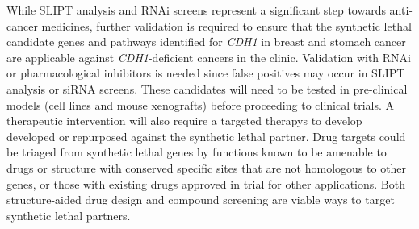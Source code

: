 
While \gls{SLIPT} analysis and \gls{RNAi} screens represent a significant step towards anti-cancer medicines, further validation is required to ensure that the \gls{synthetic lethal} candidate genes and pathways identified for \textit{CDH1} in breast and stomach cancer are applicable against \textit{CDH1}-deficient cancers in the clinic.  Validation with \gls{RNAi} or pharmacological inhibitors is needed since false positives may occur in \gls{SLIPT} analysis or \gls{siRNA} screens. These candidates will need to be tested in pre-clinical models (cell lines and mouse xenografts) before proceeding to clinical trials. A therapeutic intervention will also require a \glspl{targeted therapy}  to develop developed or repurposed against the \gls{synthetic lethal} partner. 
Drug targets could be triaged from \gls{synthetic lethal} genes by functions known to be amenable to drugs or structure with conserved specific sites that are not homologous to other genes, or those with existing drugs approved in trial for other applications. Both structure-aided drug design and compound screening are viable ways to target \gls{synthetic lethal} partners. %

